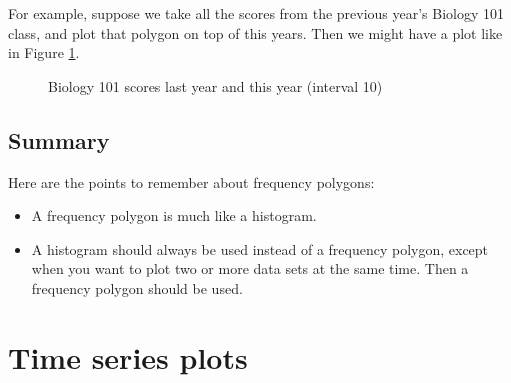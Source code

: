 \documentclass[../../../main.tex]{subfiles}
\begin{document}
For example, suppose we take all the scores from the previous year's Biology 101 class, and plot that polygon on top of this years. Then we might have a plot like in Figure \ref{plot:Biology 101 scores by 10s two polygons}.

\begin{figure}[ht]
  \caption{\label{plot:Biology 101 scores by 10s two polygons} Biology 101 scores last year and this year (interval 10)}
\end{figure}


\subsection{Summary}

Here are the points to remember about frequency polygons:

\begin{itemize}

  \item A frequency polygon is much like a histogram.
  
  \item A histogram should always be used instead of a frequency polygon, except when you want to plot two or more data sets at the same time. Then a frequency polygon should be used.

\end{itemize}


\section{Time series plots}
\end{document}
